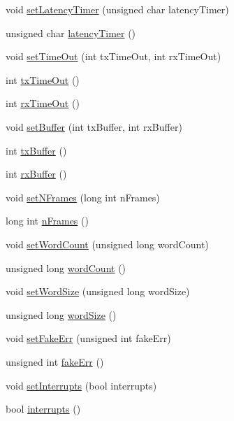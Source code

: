 \begin{DoxyCompactItemize}
\item 
void \hyperlink{classUsbFTMLInterface_a3625ccc604bbf5e707b3f5d91bc8f1bb}{setLatencyTimer} (unsigned char latencyTimer)
\item 
unsigned char \hyperlink{classUsbFTMLInterface_ac94dcd155b2e060d5fe04ccfbbb4de8d}{latencyTimer} ()
\item 
void \hyperlink{classUsbFTMLInterface_a93f8a5e14d22d36e29ffa367d60faca5}{setTimeOut} (int txTimeOut, int rxTimeOut)
\item 
int \hyperlink{classUsbFTMLInterface_ad7e76fd952273faf094bf3475b2963da}{txTimeOut} ()
\item 
int \hyperlink{classUsbFTMLInterface_a106df14066462a38f7e4849c9d15828a}{rxTimeOut} ()
\item 
void \hyperlink{classUsbFTMLInterface_a0223b6508fe1ac8da3aee952da113b1a}{setBuffer} (int txBuffer, int rxBuffer)
\item 
int \hyperlink{classUsbFTMLInterface_ada338c9311fdb6d788a951f41cf9101f}{txBuffer} ()
\item 
int \hyperlink{classUsbFTMLInterface_a41db8f21098bca8fb7a85ce1058ab10b}{rxBuffer} ()
\item 
void \hyperlink{classUsbFTMLInterface_a3a0a9d323631790c2db210fdcc85e89b}{setNFrames} (long int nFrames)
\item 
long int \hyperlink{classUsbFTMLInterface_a55531536a54b736b9c9c38bb792ec4c9}{nFrames} ()
\item 
void \hyperlink{classUsbFTMLInterface_a3061389b73d2c2be1d53007723f9280e}{setWordCount} (unsigned long wordCount)
\item 
unsigned long \hyperlink{classUsbFTMLInterface_a844ab72bfe0d3e14dd16f607a7c14905}{wordCount} ()
\item 
void \hyperlink{classUsbFTMLInterface_a8f54e893ac36ae74bd4702ae649b79dd}{setWordSize} (unsigned long wordSize)
\item 
unsigned long \hyperlink{classUsbFTMLInterface_ac313f412cbda6222ef817cb46083e2b3}{wordSize} ()
\item 
void \hyperlink{classUsbFTMLInterface_a01a8080338c5de181ad70b7506c97bc4}{setFakeErr} (unsigned int fakeErr)
\item 
unsigned int \hyperlink{classUsbFTMLInterface_a0379dd75800521cea37580d68205f620}{fakeErr} ()
\item 
void \hyperlink{classUsbFTMLInterface_ac82eb9d63d4279998765dcc8c539bba9}{setInterrupts} (bool interrupts)
\item 
bool \hyperlink{classUsbFTMLInterface_afab1c2175bd2bca261ffa2b8ee67df2d}{interrupts} ()

\end{DoxyCompactItemize}
